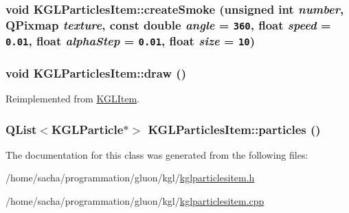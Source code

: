 \hypertarget{class_k_g_l_particles_item_55ff83e136b35f0caaeb0ef065623573}{
\subsubsection[{createSmoke}]{\setlength{\rightskip}{0pt plus 5cm}void KGLParticlesItem::createSmoke (unsigned int {\em number}, \/  QPixmap {\em texture}, \/  const double {\em angle} = {\tt 360}, \/  float {\em speed} = {\tt 0.01}, \/  float {\em alphaStep} = {\tt 0.01}, \/  float {\em size} = {\tt 10})}}
\label{class_k_g_l_particles_item_55ff83e136b35f0caaeb0ef065623573}


\hypertarget{class_k_g_l_particles_item_ce6df2f63f0566993f075f7ce55bb714}{
\subsubsection[{draw}]{\setlength{\rightskip}{0pt plus 5cm}void KGLParticlesItem::draw ()}}
\label{class_k_g_l_particles_item_ce6df2f63f0566993f075f7ce55bb714}




Reimplemented from \hyperlink{class_k_g_l_item_4e4766cf0362fa050bffdf5f45d6d13f}{KGLItem}.\hypertarget{class_k_g_l_particles_item_fd39ca4535f227749edc932acbfb23f9}{
\subsubsection[{particles}]{\setlength{\rightskip}{0pt plus 5cm}QList$<${\bf KGLParticle}$\ast$$>$ KGLParticlesItem::particles ()}}
\label{class_k_g_l_particles_item_fd39ca4535f227749edc932acbfb23f9}




The documentation for this class was generated from the following files:\begin{CompactItemize}
\item 
/home/sacha/programmation/gluon/kgl/\hyperlink{kglparticlesitem_8h}{kglparticlesitem.h}\item 
/home/sacha/programmation/gluon/kgl/\hyperlink{kglparticlesitem_8cpp}{kglparticlesitem.cpp}\end{CompactItemize}
